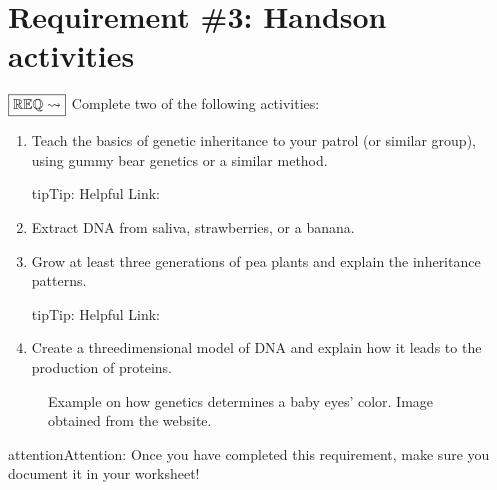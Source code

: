 \documentclass[letterpaper,10pt,english,openany,oneside]{sphinxmanual}
\let\sphinxpxdimen\pdfpxdimen\else\newdimen\sphinxpxdimen
\begin{document}
\chapter{Requirement \#3: Hands\sphinxhyphen{}on activities}
\label{\detokenize{requirement3:requirement-3-hands-on-activities}}\label{\detokenize{requirement3::doc}}
\(\boxed{\mathbb{REQ}\Large \rightsquigarrow}\) Complete two of the following activities:
\begin{enumerate}
%
\item {} 
Teach the basics of genetic inheritance to your patrol (or similar group), using gummy bear genetics or a similar method.

\begin{sphinxadmonition}{tip}{Tip:}
Helpful Link: 
\end{sphinxadmonition}

\item {} 
Extract DNA from saliva, strawberries, or a banana.

\item {} 
Grow at least three generations of pea plants and explain the inheritance patterns.

\begin{sphinxadmonition}{tip}{Tip:}
Helpful Link: 
\end{sphinxadmonition}

\item {} 
Create a three\sphinxhyphen{}dimensional model of DNA and explain how it leads to the production of proteins.

\end{enumerate}

\begin{figure}[htbp]
\centering
\capstart

\noindent\sphinxincludegraphics[width=400\sphinxpxdimen]{{babyeyecolor.jpg}.webp}
\caption{Example on how genetics determines a baby eyes’ color. Image obtained from the   website.}\label{\detokenize{requirement3:id1}}\end{figure}

\begin{sphinxadmonition}{attention}{Attention:}
Once you have completed this requirement, make sure you document it in your worksheet!
\end{sphinxadmonition}
\end{document}
